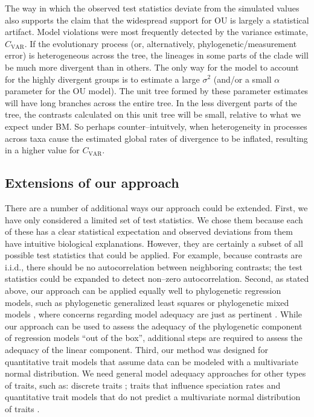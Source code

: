 \documentclass[a4paper,11pt]{article}
\begin{document}
The way in which the observed test statistics deviate from the simulated values also supports the claim that the widespread support for OU is largely a statistical artifact. Model violations were most frequently detected by the variance estimate, $C_{\text{VAR}}$. If the evolutionary process (or, alternatively, phylogenetic/measurement error) is heterogeneous across the tree, the lineages in some parts of the clade will be much more divergent than in others. The only way for the model to account for the highly divergent groups is to estimate a large $\sigma^2$ (and/or a small $\alpha$ parameter for the OU model). The unit tree formed by these parameter estimates will have long branches across the entire tree. In the less divergent parts of the tree, the contrasts calculated on this unit tree will be small, relative to what we expect under BM. So perhaps counter--intuitvely, when heterogeneity in processes across taxa cause the estimated global rates of divergence to be inflated, resulting in a higher value for $C_{\text{VAR}}$. 

\subsection{Extensions of our approach}

There are a number of additional ways our approach could be extended. First, we have only considered a limited set of test statistics. We chose them because each of these has a clear statistical expectation and observed deviations from them have intuitive biological explanations. However, they are certainly a subset of all possible test statistics that could be applied. 
For example, because contrasts are i.i.d., there should be no autocorrelation between neighboring contrasts; the test statistics could be expanded to detect non--zero autocorrelation. Second, as stated above, our approach can be applied equally well to phylogenetic regression models, such as phylogenetic generalized least squares \citep{Grafen1989, MartinsHansen1997} or phylogenetic mixed models \citep{Lynch1991, Housworth2004, Hadfield2010}, where concerns regarding model adequacy are just as pertinent \citep{Hansen2012}. While our approach can be used to assess the adequacy of the phylogenetic component of regression models ``out of the box'', additional steps are required to assess the adequacy of the linear component.  Third, our method was designed for quantitative trait models that assume data can be modeled with a multivariate normal distribution. We need general model adequacy approaches for other types of traits, such as: discrete traits \citep[i.e., binary, multistate, ordinal; see][for recent discussions of this]{Beaulieu2013, Blackmon2014, MaddisonFitzJohn}; traits that influence speciation rates \citep[e.g.,][]{Maddison2007, FitzJohn2010} and quantitative trait models that do not predict a multivariate normal distribution of traits \citep{Landis2012, Landispreprint}.
\end{document}
